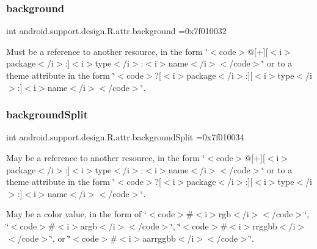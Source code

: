 \subsubsection{\texorpdfstring{background}{background}}
{\footnotesize\ttfamily int android.\+support.\+design.\+R.\+attr.\+background =0x7f010032\hspace{0.3cm}{\ttfamily [static]}}

Must be a reference to another resource, in the form \char`\"{}$<$code$>$@\mbox{[}+\mbox{]}\mbox{[}$<$i$>$package$<$/i$>$\+:\mbox{]}$<$i$>$type$<$/i$>$\+:$<$i$>$name$<$/i$>$$<$/code$>$\char`\"{} or to a theme attribute in the form \char`\"{}$<$code$>$?\mbox{[}$<$i$>$package$<$/i$>$\+:\mbox{]}\mbox{[}$<$i$>$type$<$/i$>$\+:\mbox{]}$<$i$>$name$<$/i$>$$<$/code$>$\char`\"{}. \mbox{\label{classandroid_1_1support_1_1design_1_1R_1_1attr_a801eb11b48747bfa6b51d9658255cfec}} 
\subsubsection{\texorpdfstring{background\+Split}{backgroundSplit}}
{\footnotesize\ttfamily int android.\+support.\+design.\+R.\+attr.\+background\+Split =0x7f010034\hspace{0.3cm}{\ttfamily [static]}}

May be a reference to another resource, in the form \char`\"{}$<$code$>$@\mbox{[}+\mbox{]}\mbox{[}$<$i$>$package$<$/i$>$\+:\mbox{]}$<$i$>$type$<$/i$>$\+:$<$i$>$name$<$/i$>$$<$/code$>$\char`\"{} or to a theme attribute in the form \char`\"{}$<$code$>$?\mbox{[}$<$i$>$package$<$/i$>$\+:\mbox{]}\mbox{[}$<$i$>$type$<$/i$>$\+:\mbox{]}$<$i$>$name$<$/i$>$$<$/code$>$\char`\"{}. 

May be a color value, in the form of \char`\"{}$<$code$>$\#$<$i$>$rgb$<$/i$>$$<$/code$>$\char`\"{}, \char`\"{}$<$code$>$\#$<$i$>$argb$<$/i$>$$<$/code$>$\char`\"{}, \char`\"{}$<$code$>$\#$<$i$>$rrggbb$<$/i$>$$<$/code$>$\char`\"{}, or \char`\"{}$<$code$>$\#$<$i$>$aarrggbb$<$/i$>$$<$/code$>$\char`\"{}. \mbox{\label{classandroid_1_1support_1_1design_1_1R_1_1attr_a6b96e24534eaaeeed54585fb284f429e}} 
